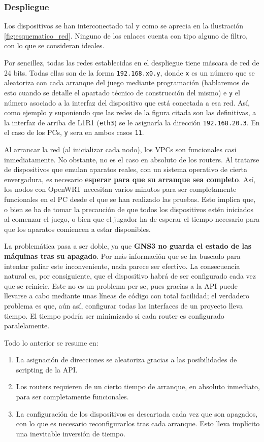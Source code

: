 \subsubsection{Despliegue}
Los dispositivos se han interconectado tal y como se aprecia en la ilustración \ref{fig:esquematico_red}. Ninguno de los enlaces cuenta con tipo alguno de filtro, con lo que se consideran ideales.

Por sencillez, todas las redes establecidas en el despliegue tiene máscara de red de 24 bits. Todas ellas son de la forma \texttt{192.168.x0.y}, donde \texttt{x} es un número que se aleatoriza con cada arranque del juego mediante programación (hablaremos de esto cuando se detalle el apartado técnico de construcción del mismo) e \texttt{y} el número asociado a la interfaz del dispositivo que está conectada a esa red. Así, como ejemplo y suponiendo que las redes de la figura citada son las definitivas, a la interfaz de arriba de L1R1 (\texttt{eth3}) se le asignaría la dirección \texttt{192.168.20.3}. En el caso de los PCs, \texttt{y} sera en ambos casos \texttt{11}.

Al arrancar la red (al inicializar cada nodo), los VPCs son funcionales casi inmediatamente. No obstante, no es el caso en absoluto de los routers. Al tratarse de dispositivos que emulan aparatos reales, con un sistema operativo de cierta envergadura, es necesario \textbf{esperar para que su arranque sea completo}. Así, los nodos con OpenWRT necesitan varios minutos para ser completamente funcionales en el PC desde el que se han realizado las pruebas. Esto implica que, o bien se ha de tomar la precaución de que todos los dispositivos estén iniciados al comenzar el juego, o bien que el jugador ha de esperar el tiempo necesario para que los aparatos comiencen a estar disponibles.

La problemática pasa a ser doble, ya que \textbf{GNS3 no guarda el estado de las máquinas tras su apagado}. Por más información que se ha buscado para intentar paliar este inconveniente, nada parece ser efectivo. La consecuencia natural es, por consiguiente, que el dispositivo habrá de ser configurado cada vez que se reinicie. Este no es un problema per se, pues gracias a la API puede llevarse a cabo mediante unas líneas de código con total facilidad; el verdadero problema es que, aún así, configurar todas las interfaces de un proyecto lleva tiempo. El tiempo podría ser minimizado si cada router es configurado paralelamente.

Todo lo anterior se resume en:
\begin{enumerate}
\item La asignación de direcciones se aleatoriza gracias a las posibilidades de scripting de la API.
\item Los routers requieren de un cierto tiempo de arranque, en absoluto inmediato, para ser completamente funcionales.
\item La configuración de los dispositivos es descartada cada vez que son apagados, con lo que es necesario reconfigurarlos tras cada arranque. Esto lleva implícito una inevitable inversión de tiempo.
\end{enumerate}

